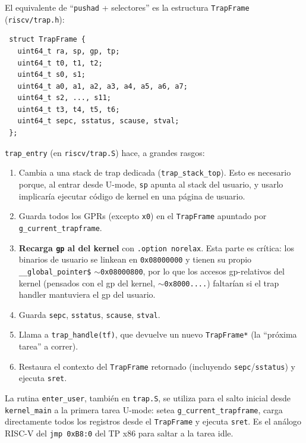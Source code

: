 El equivalente de ``\texttt{pushad} + selectores'' es la estructura \texttt{TrapFrame} (\texttt{riscv/trap.h}):

\begin{codesnippet}
\begin{verbatim}
 struct TrapFrame {
   uint64_t ra, sp, gp, tp;
   uint64_t t0, t1, t2;
   uint64_t s0, s1;
   uint64_t a0, a1, a2, a3, a4, a5, a6, a7;
   uint64_t s2, ..., s11;
   uint64_t t3, t4, t5, t6;
   uint64_t sepc, sstatus, scause, stval;
 };
\end{verbatim}
\end{codesnippet}

\texttt{trap\_entry} (en \texttt{riscv/trap.S}) hace, a grandes rasgos:

\begin{enumerate}
  \item Cambia a una stack de trap dedicada (\texttt{trap\_stack\_top}). Esto es necesario porque, al entrar desde
  U-mode, \texttt{sp} apunta al stack del usuario, y usarlo implicaría ejecutar código de kernel en una página de
  usuario.
  \item Guarda todos los GPRs (excepto \texttt{x0}) en el \texttt{TrapFrame} apuntado por
  \texttt{g\_current\_trapframe}.
  \item \textbf{Recarga \texttt{gp} al del kernel} con \texttt{.option norelax}. Esta parte es crítica: los binarios de
  usuario se linkean en \texttt{0x08000000} y tienen su propio \texttt{\_\_global\_pointer\$} $\sim$\texttt{0x08000800},
  por lo que los accesos gp-relativos del kernel (pensados con el gp del kernel, $\sim$\texttt{0x8000....}) faltarían si
  el trap handler mantuviera el gp del usuario.
  \item Guarda \texttt{sepc}, \texttt{sstatus}, \texttt{scause}, \texttt{stval}.
  \item Llama a \texttt{trap\_handle(tf)}, que devuelve un nuevo \texttt{TrapFrame*} (la ``próxima tarea'' a correr).
  \item Restaura el contexto del \texttt{TrapFrame} retornado (incluyendo \texttt{sepc}/\texttt{sstatus}) y ejecuta
  \texttt{sret}.
\end{enumerate}

La rutina \texttt{enter\_user}, también en \texttt{trap.S}, se utiliza para el salto inicial desde \texttt{kernel\_main}
a la primera tarea U-mode: setea \texttt{g\_current\_trapframe}, carga directamente todos los registros desde el
\texttt{TrapFrame} y ejecuta \texttt{sret}. Es el análogo RISC-V del \texttt{jmp 0xB8:0} del TP x86 para saltar a la
tarea idle.


